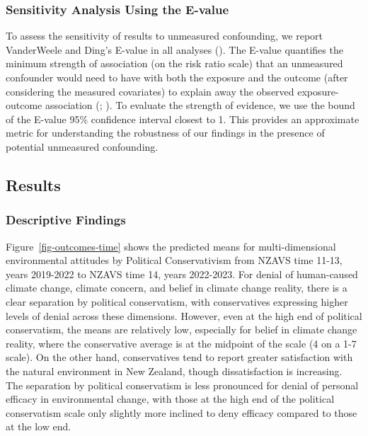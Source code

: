\documentclass[
  single column]{article}
\begin{document}
\subsubsection{Sensitivity Analysis Using the
E-value}\label{sensitivity-analysis-using-the-e-value}

To assess the sensitivity of results to unmeasured confounding, we
report VanderWeele and Ding's E-value in all analyses
(). The E-value
quantifies the minimum strength of association (on the risk ratio scale)
that an unmeasured confounder would need to have with both the exposure
and the outcome (after considering the measured covariates) to explain
away the observed exposure-outcome association
(;
). To
evaluate the strength of evidence, we use the bound of the E-value 95\%
confidence interval closest to 1. This provides an approximate metric
for understanding the robustness of our findings in the presence of
potential unmeasured confounding.

\subsection{Results}\label{results}

\subsubsection{Descriptive Findings}\label{descriptive-findings}

Figure~\ref{fig-outcomes-time} shows the predicted means for
multi-dimensional environmental attitudes by Political Conservativism
from NZAVS time 11-13, years 2019-2022 to NZAVS time 14, years
2022-2023. For denial of human-caused climate change, climate concern,
and belief in climate change reality, there is a clear separation by
political conservatism, with conservatives expressing higher levels of
denial across these dimensions. However, even at the high end of
political conservatism, the means are relatively low, especially for
belief in climate change reality, where the conservative average is at
the midpoint of the scale (4 on a 1-7 scale). On the other hand,
conservatives tend to report greater satisfaction with the natural
environment in New Zealand, though dissatisfaction is increasing. The
separation by political conservatism is less pronounced for denial of
personal efficacy in environmental change, with those at the high end of
the political conservatism scale only slightly more inclined to deny
efficacy compared to those at the low end.
\end{document}
